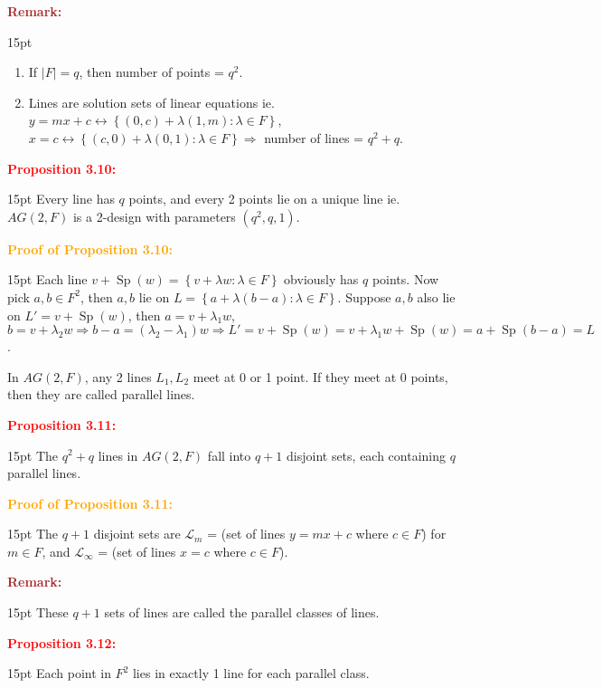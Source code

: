 \documentclass[12pt]{article}
\newcommand{\noparskip}{\vspace{-\parskip}}
\newenvironment{points}
	{\begin{enumerate}[label = (\arabic*)]}
	{\end{enumerate}}
\newenvironment{dent}
	{\begin{adjustwidth}{15pt}{}\noparskip}
	{\end{adjustwidth}}
\newenvironment{result}[1]
	{\textcolor{Red}{\textbf{#1:}}\begin{dent}}
	{\end{dent}}
\newenvironment{proof}[1]
	{\textcolor{Orange}{\textbf{Proof of #1:}}\begin{dent}}
	{\end{dent}}
\newenvironment{remark}
	{\textcolor{Brown}{\textbf{Remark:}}\begin{dent}}
	{\end{dent}}
\renewcommand{\implies}{\Rightarrow}
\newcommand{\set}[1]{\left\{ #1 \right\}}
\newcommand{\sizeof}[1]{\left| #1 \right|}
\renewcommand{\span}[1]{\operatorname{Sp}(#1)}
\newcommand{\cL}{\mathcal{L}}
\begin{document}
\begin{remark}
\begin{points}
\item If $\sizeof{F} = q$, then number of points = $q^2$.
\item Lines are solution sets of linear equations ie. $y = mx + c \leftrightarrow \set{(0, c) + \lambda (1, m): \lambda \in F}$, $x = c \leftrightarrow \set{(c, 0) + \lambda (0, 1): \lambda \in F} \implies$ number of lines = $q^2 + q$.
\end{points}
\end{remark}

\begin{result}{Proposition 3.10}
Every line has $q$ points, and every 2 points lie on a unique line ie. $AG(2, F)$ is a 2-design with parameters $(q^2, q, 1)$.
\end{result}

\begin{proof}{Proposition 3.10}
Each line $v + \span{w} = \set{v + \lambda w: \lambda \in F}$ obviously has $q$ points. Now pick $a, b \in F^2$, then $a, b$ lie on $L = \set{a + \lambda (b - a): \lambda \in F}$. Suppose $a, b$ also lie on $L' = v + \span{w}$, then $a = v + \lambda_1 w$, $b = v + \lambda_2 w \implies b - a = (\lambda_2 - \lambda_1)w \implies L' = v + \span{w} = v + \lambda_1 w + \span{w} = a + \span{b - a} = L$.
\end{proof}

In $AG(2, F)$, any 2 lines $L_1, L_2$ meet at 0 or 1 point. If they meet at 0 points, then they are called parallel lines.

\begin{result}{Proposition 3.11}
The $q^2 + q$ lines in $AG(2, F)$ fall into $q + 1$ disjoint sets, each containing $q$ parallel lines.
\end{result}

\begin{proof}{Proposition 3.11}
The $q + 1$ disjoint sets are $\cL_m$ = (set of lines $y = mx + c$ where $c \in F$) for $m \in F$, and $\cL_\infty$ = (set of lines $x = c$ where $c \in F$).
\end{proof}

\begin{remark}
These $q + 1$ sets of lines are called the parallel classes of lines.
\end{remark}

\begin{result}{Proposition 3.12}
Each point in $F^2$ lies in exactly 1 line for each parallel class.
\end{result}
\end{document}
